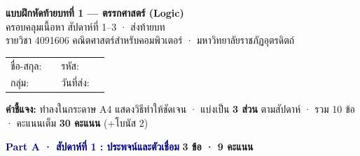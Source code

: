\documentclass[a4paper,14pt]{article}
\begin{document}
\begin{tcolorbox}[colback=navy,colframe=navy,coltext=white,
  arc=4mm,boxrule=0pt,left=10pt,right=10pt,top=8pt,bottom=8pt]
\begin{center}
{\Large\bfseries แบบฝึกหัดท้ายบทที่ 1 — ตรรกศาสตร์ (Logic)}\\[2pt]
{\large ครอบคลุมเนื้อหา สัปดาห์ที่ 1--3 · ส่งท้ายบท}\\[2pt]
{\normalsize รายวิชา 4091606 คณิตศาสตร์สำหรับคอมพิวเตอร์ · มหาวิทยาลัยราชภัฏอุตรดิตถ์}
\end{center}
\end{tcolorbox}

\vspace{0.3em}

\noindent
\begin{tabularx}{\textwidth}{@{}l X l X@{}}
ชื่อ-สกุล: & \dotfill & รหัส: & \dotfill \\
กลุ่ม: & \dotfill & วันที่ส่ง: & \dotfill \\
\end{tabularx}

\vspace{0.2em}

\begin{tcolorbox}[colback=cream,colframe=gold,arc=3mm,boxrule=0.5pt,
  left=10pt,right=10pt,top=5pt,bottom=5pt]
\textbf{คำชี้แจง:} ทำลงในกระดาษ A4 แสดงวิธีทำให้ชัดเจน · แบ่งเป็น \textbf{3 ส่วน} ตามสัปดาห์ · รวม 10 ข้อ · คะแนนเต็ม \textbf{30 คะแนน} (+โบนัส 2)
\end{tcolorbox}

\vspace{0.4em}

\begin{tcolorbox}[colback=lightnavy,colframe=navy,arc=3mm,boxrule=0.5pt,
  left=10pt,right=10pt,top=5pt,bottom=5pt]
\textbf{\textcolor{navy}{Part A · สัปดาห์ที่ 1 : ประพจน์และตัวเชื่อม}} \hfill \textbf{3 ข้อ · 9 คะแนน}
\end{tcolorbox}
\end{document}
